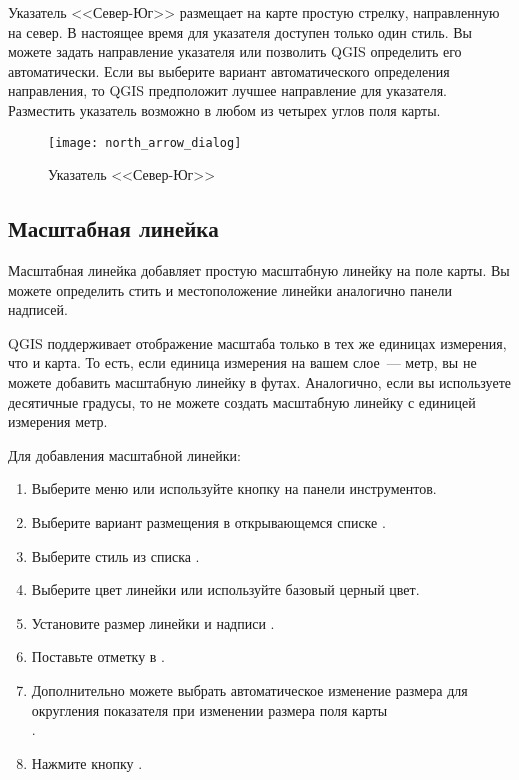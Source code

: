 Указатель <<Север-Юг>> размещает на карте простую стрелку, направленную
на север. В настоящее время для указателя доступен только один стиль. Вы
можете задать направление указателя или позволить QGIS определить его
автоматически. Если вы выберите вариант автоматического определения
направления, то QGIS предположит лучшее направление для указателя. Разместить
указатель возможно в любом из четырех углов поля карты.

\begin{figure}[ht]
   \centering
   \texttt{[image: north\_arrow\_dialog]}
   \caption{Указатель <<Север-Юг>> \wincaption}\label{fig:north_arrow}
\end{figure}

\subsection{Масштабная линейка}\label{scalebar}

Масштабная линейка добавляет простую масштабную линейку на поле
карты. Вы можете определить стить и местоположение линейки аналогично
 панели надписей.

QGIS поддерживает отображение масштаба только в тех же единицах измерения,
что и карта. То есть, если единица измерения на вашем слое~--- метр, вы не
можете добавить масштабную линейку в футах. Аналогично, если вы используете
десятичные градусы, то не можете создать масштабную линейку с единицей
измерения метр.

Для добавления масштабной линейки:

\begin{enumerate}
\item Выберите меню  \arrow {}
\arrow {} или используйте
кнопку  на панели инструментов.
\item Выберите вариант размещения в открывающемся списке
.
\item Выберите стиль из списка .
\item Выберите цвет линейки  или используйте
базовый церный цвет.
\item Установите размер линейки и надписи .
\item Поставьте отметку в .
\item Дополнительно можете выбрать автоматическое изменение размера для
округления показателя при изменении  размера поля карты \\
.
\item Нажмите кнопку .
\end{enumerate}


